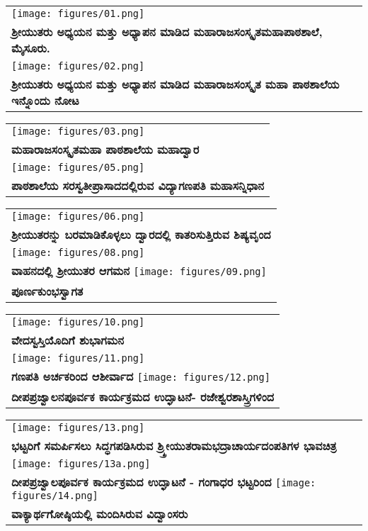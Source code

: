 {\tabcolsep=0pt
\noindent
\begin{tabular}{>{\centering}p{11cm}}
\texttt{[image: figures/01.png]}\\
\textbf{ ಶ್ರೀಯುತರು ಅಧ್ಯಯನ ಮತ್ತು ಅಧ್ಯಾಪನ ಮಾಡಿದ ಮಹಾರಾಜಸಂಸ್ಕೃತಮಹಾಪಾಠಶಾಲೆ, ಮೈಸೂರು.}\\
\texttt{[image: figures/02.png]}\\
\textbf{ ಶ್ರೀಯುತರು ಅಧ್ಯಯನ ಮತ್ತು ಅಧ್ಯಾಪನ ಮಾಡಿದ ಮಹಾರಾಜಸಂಸ್ಕೃತ ಮಹಾ ಪಾಠಶಾಲೆಯ ಇನ್ನೊಂದು ನೋಟ}
\end{tabular}
}

{\tabcolsep=0pt
\noindent
\begin{tabular}{>{\centering}p{11cm}}
\texttt{[image: figures/03.png]}\\
\textbf{ಮಹಾರಾಜಸಂಸ್ಕೃತಮಹಾ ಪಾಠಶಾಲೆಯ ಮಹಾದ್ವಾರ}\\[12pt]
\texttt{[image: figures/05.png]}\\
\textbf{ಪಾಠಶಾಲೆಯ ಸರಸ್ವತೀಪ್ರಾಸಾದದಲ್ಲಿರುವ ವಿದ್ಯಾಗಣಪತಿ ಮಹಾಸನ್ನಿಧಾನ}\\[12pt]

\end{tabular}
}

{\tabcolsep=0pt
\noindent
\begin{tabular}{>{\centering}p{11cm}}
\texttt{[image: figures/06.png]}\\
\textbf{ ಶ್ರೀಯುತರನ್ನು ಬರಮಾಡಿಕೊಳ್ಳಲು ದ್ವಾರದಲ್ಲಿ ಕಾತರಿಸುತ್ತಿರುವ  ಶಿಷ್ಯವೃಂದ}\\[12pt]
\texttt{[image: figures/08.png]}\\
\textbf{ವಾಹನದಲ್ಲಿ ಶ್ರೀಯುತರ ಆಗಮನ}
\texttt{[image: figures/09.png]}\\
\textbf{ಪೂರ್ಣಕುಂಭಸ್ವಾಗತ}
\end{tabular}
}

{\tabcolsep=0pt
\noindent
\begin{tabular}{>{\centering}p{11cm}}
\texttt{[image: figures/10.png]}\\
\textbf{ವೇದಸ್ವಸ್ತಿಯೊದಿಗೆ ಶುಭಾಗಮನ}\\[12pt]
\texttt{[image: figures/11.png]}\\
\textbf{ಗಣಪತಿ ಅರ್ಚಕರಿಂದ ಆಶೀರ್ವಾದ}
\texttt{[image: figures/12.png]}\\
\textbf{ದೀಪಪ್ರಜ್ವಾಲನಪೂರ್ವಕ ಕಾರ್ಯಕ್ರಮದ ಉದ್ಘಾಟನೆ- ರಜೇಶ್ವರಶಾಸ್ತ್ರಿಗಳಿಂದ}
\end{tabular}
}

{\tabcolsep=0pt
\noindent
\begin{tabular}{>{\centering}p{11cm}}
\texttt{[image: figures/13.png]}\\
\textbf{ಭಟ್ಟರಿಗೆ ಸಮರ್ಪಿಸಲು  ಸಿದ್ಧಗಪಡಿಸಿರುವ ಶ್ರ್ಶ್ರೀಯುತರಾಮಭದ್ರಾಚಾರ್ಯದಂಪತಿಗಳ ಭಾವಚಿತ್ರ}\\[12pt]
\texttt{[image: figures/13a.png]}\\
\textbf{ದೀಪಪ್ರಜ್ವಾಲಪೂರ್ವಕ ಕಾರ್ಯಕ್ರಮದ ಉದ್ಘಾಟನೆ - ಗಂಗಾಧರ ಭಟ್ಟರಿಂದ}
\texttt{[image: figures/14.png]}\\
\textbf{ವಾಕ್ಯಾರ್ಥಗೋಷ್ಠಿಯಲ್ಲಿ ಮಂದಿಸಿರುವ ವಿದ್ವಾಂಸರು}
\end{tabular}
}

